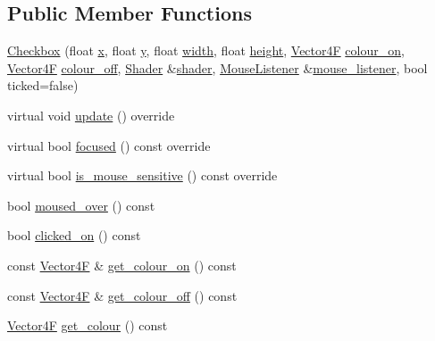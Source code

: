 \subsection*{Public Member Functions}
\begin{DoxyCompactItemize}
\item 
\mbox{\hyperlink{class_checkbox_aef583c2ed2cc9004aec3330f9b9d02a3}{Checkbox}} (float \mbox{\hyperlink{class_g_u_i_a7fa193a8ffb27bbb3bcc225e36f6d54d}{x}}, float \mbox{\hyperlink{class_g_u_i_a98f204f99ffc5ff6cffc9340bbb8c29b}{y}}, float \mbox{\hyperlink{class_g_u_i_aee5d8766834f6f743f0d8b8c16e47155}{width}}, float \mbox{\hyperlink{class_g_u_i_a70b578c36323a45cac88ccff3bced933}{height}}, \mbox{\hyperlink{class_vector4}{Vector4F}} \mbox{\hyperlink{class_checkbox_adf8806f2b48dfe1d415d108f3ef5bc8c}{colour\+\_\+on}}, \mbox{\hyperlink{class_vector4}{Vector4F}} \mbox{\hyperlink{class_checkbox_a09f7af816849a1b505af2e746847fcc4}{colour\+\_\+off}}, \mbox{\hyperlink{class_shader}{Shader}} \&\mbox{\hyperlink{class_g_u_i_a64b007b31d0ec8a8704f9ab3bb2a7d3d}{shader}}, \mbox{\hyperlink{class_mouse_listener}{Mouse\+Listener}} \&\mbox{\hyperlink{class_checkbox_a7cf00bf1e5b41dcf590e7e836e937ead}{mouse\+\_\+listener}}, bool ticked=false)
\item 
virtual void \mbox{\hyperlink{class_checkbox_a69c9fb9ce334fc8ff76c49447f1e002d}{update}} () override
\item 
virtual bool \mbox{\hyperlink{class_checkbox_a2a2c82a9e8c95ad868ce85a60ba07292}{focused}} () const override
\item 
virtual bool \mbox{\hyperlink{class_checkbox_a63fc27bae94d81d4dee8cd2d0e474d2b}{is\+\_\+mouse\+\_\+sensitive}} () const override
\item 
bool \mbox{\hyperlink{class_checkbox_a6780c6fb30c8b7cec8b55943ec31f1f4}{moused\+\_\+over}} () const
\item 
bool \mbox{\hyperlink{class_checkbox_a67e81d283ae9ead851c902572096bd99}{clicked\+\_\+on}} () const
\item 
const \mbox{\hyperlink{class_vector4}{Vector4F}} \& \mbox{\hyperlink{class_checkbox_accb44cc4cde3fe6ad7a88b27831fa37a}{get\+\_\+colour\+\_\+on}} () const
\item 
const \mbox{\hyperlink{class_vector4}{Vector4F}} \& \mbox{\hyperlink{class_checkbox_ac99d837db8754756bcaa417e96162844}{get\+\_\+colour\+\_\+off}} () const
\item 
\mbox{\hyperlink{class_vector4}{Vector4F}} \mbox{\hyperlink{class_checkbox_ada05d14b0502bc3534c83478b7bad8fb}{get\+\_\+colour}} () const
\end{DoxyCompactItemize}
